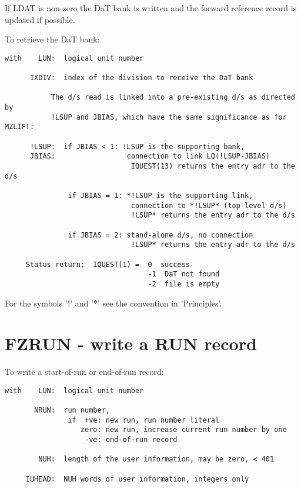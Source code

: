 If LDAT is non-zero the DaT bank is written and the forward reference
record is updated if possible.

\vspace*{12pt}
To retrieve the DaT bank:

\begin{verbatim}
with    LUN:  logical unit number

      IXDIV:  index of the division to receive the DaT bank

           The d/s read is linked into a pre-existing d/s as directed by
           !LSUP and JBIAS, which have the same significance as for MZLIFT:

      !LSUP:  if JBIAS < 1: !LSUP is the supporting bank,
      JBIAS:                 connection to link LQ(!LSUP-JBIAS)
                              IQUEST(13) returns the entry adr to the d/s

               if JBIAS = 1: *!LSUP is the supporting link,
                              connection to *!LSUP* (top-level d/s)
                              !LSUP* returns the entry adr to the d/s

               if JBIAS = 2: stand-alone d/s, no connection
                              !LSUP* returns the entry adr to the d/s

     Status return:  IQUEST(1) =  0  success
                                  -1  DaT not found
                                  -2  file is empty
\end{verbatim}
For the symbols '!' and '*' see the convention in 'Principles'.

\section{FZRUN - write a RUN record}

To write a start-of-run or end-of-run record:

\begin{verbatim}
with    LUN:  logical unit number

       NRUN:  run number,
               if  +ve: new run, run number literal
                  zero: new run, increase current run number by one
                   -ve: end-of-run record

        NUH:  length of the user information, may be zero, < 401

     IUHEAD:  NUH words of user information, integers only
\end{verbatim}

